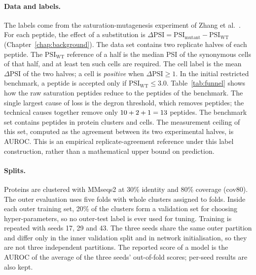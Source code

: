 \paragraph{Data and labels.}
The labels come from the saturation-mutagenesis experiment of Zhang et al.\ \citep{zhang2023,zhang2023data}.
For each peptide, the effect of a substitution is $\Delta\mathrm{PSI}=\mathrm{PSI}_{\mathrm{mutant}}-\mathrm{PSI}_{\mathrm{WT}}$
(Chapter~\ref{chap:background}). The data set contains two replicate halves of each peptide. The
$\mathrm{PSI}_{\mathrm{WT}}$ reference of a half is the median PSI of the synonymous cells of that half,
and at least ten such cells are required. The cell label is the mean $\Delta\mathrm{PSI}$ of the two halves;
a cell is \emph{positive} when $\Delta\mathrm{PSI}\ge 1$. In the initial restricted benchmark, a peptide is accepted only if
$\mathrm{PSI}_{\mathrm{WT}}\le 3.0$. Table~\ref{tab:funnel} shows how the \nNRaw{} raw saturation peptides reduce to
the \nNKept{} peptides of the benchmark. The single largest cause of loss is the degron threshold, which
removes \nNDropDegron{} peptides; the technical causes together remove only
$10+2+1=13$ peptides. The benchmark set contains \nNPep{} peptides in \nNClu{}
protein clusters and \nNCells{} cells. The measurement ceiling of this set, computed as the agreement between
its two experimental halves, is \nCeilingSat{} AUROC. This is an empirical replicate-agreement
reference under this label construction, rather than a mathematical upper bound on prediction.

\begin{table}[htbp]
  \centering
  \caption{Fate of the raw saturation peptides under the label filters}\label{tab:funnel}
  
\end{table}

\paragraph{Splits.}
Proteins are clustered with MMseqs2 \citep{steinegger2017} at 30\% identity and 80\% coverage (cov80). The
outer evaluation uses five folds with whole clusters assigned to folds. Inside each outer training set, 20\%
of the clusters form a validation set for choosing hyper-parameters, so no outer-test label is ever used for
tuning. Training is repeated with seeds 17, 29 and 43. The three seeds share the same outer partition and
differ only in the inner validation split and in network initialisation, so they are not three independent
partitions. The reported score of a model is the AUROC of the average of the three seeds' out-of-fold
scores; per-seed results are also kept.

